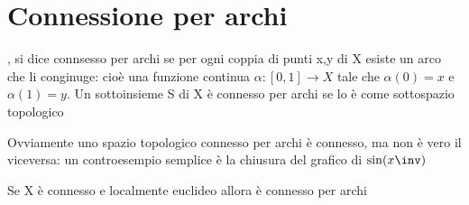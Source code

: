 \documentclass[a4paper]{article}
\begin{document}
\section{Connessione per archi}

\begin{deff}
	\xtausptop, si dice connsesso per archi se per ogni coppia di punti x,y di X esiste un arco che li conginuge: cioè una funzione continua $ \alpha : [0,1] \to X $ tale che $\alpha (0)=x$ e $\alpha (1)=y$.
	Un sottoinsieme S di X è connesso per archi se lo è come sottospazio topologico
\end{deff}
	
\begin{oss}
	Ovviamente uno spazio topologico connesso per archi è connesso, ma non è vero il viceversa: un controesempio semplice è la chiusura del grafico di $\sin (x\inv )$
\end{oss} 

\begin{lem}
	Se X è connesso e localmente euclideo allora è connesso per archi
\end{lem}
\end{document}
